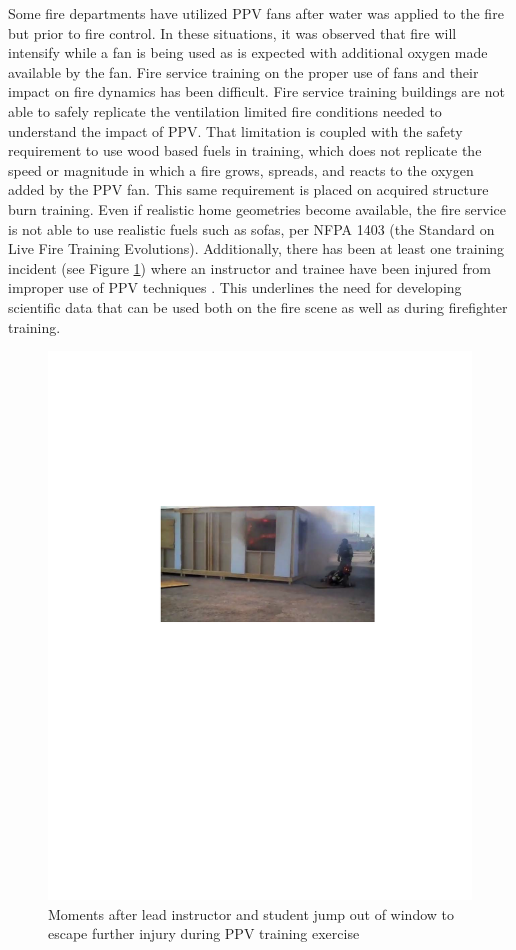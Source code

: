 \documentclass{article}
\begin{document}
Some fire departments have utilized PPV fans after water was applied to the fire but prior to fire control. In these situations, it was observed that fire will intensify while a fan is being used as is expected with additional oxygen made available by the fan. Fire service training on the proper use of fans and their impact on fire dynamics has been difficult. Fire service training buildings are not able to safely replicate the ventilation limited fire conditions needed to understand the impact of PPV. That limitation is coupled with the safety requirement to use wood based fuels in training, which does not replicate the speed or magnitude in which a fire grows, spreads, and reacts to the oxygen added by the PPV fan. This same requirement is placed on acquired structure burn training. Even if realistic home geometries become available, the fire service is not able to use realistic fuels such as sofas, per NFPA 1403 (the Standard on Live Fire Training Evolutions). Additionally, there has been at least one training incident (see Figure \ref{fig:PPVTrainingInj}) where an instructor and trainee have been injured from improper use of PPV techniques \cite{LasVegasNews_ChiefsRole}. This underlines the need for developing scientific data that can be used both on the fire scene as well as during firefighter training.

\begin{figure}[H]
	\centering
	\includegraphics[width = 5in]{0_Images/Background/PPVTrainingInjury.pdf}
	\caption{Moments after lead instructor and student jump out of window to escape further injury during PPV training exercise}
	\label{fig:PPVTrainingInj}
\end{figure}
\end{document}
